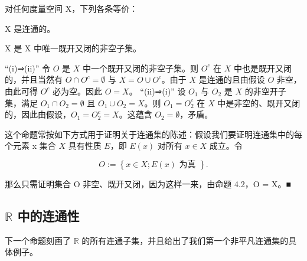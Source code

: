 \begin{proposition}

对任何度量空间 X，下列各条等价：

\begin{subitems}
\item

X 是连通的。

\item

X 是 X 中唯一既开又闭的非空子集。

\proofhead
“(i)⇒(ii)” 令 $O$ 是 $X$ 中一个既开又闭的非空子集。则 $O^{c}$ 在 $X$ 中也是既开又闭的，并且当然有 $O \cap O^{c} = \emptyset$ 与 $X = O \cup O^{c}$。由于 $X$ 是连通的且由假设 $O$ 非空，由此可得 $O^{c}$ 必为空。因此 $O = X$。
“(ii)⇒(i)” 设 $O_1$ 与 $O_2$ 是 $X$ 的非空开子集，满足 $O_1 \cap O_2 = \emptyset$ 且 $O_1 \cup O_2 = X$。则 $O_1 = O_2^c$ 在 $X$ 中是非空的、既开又闭的，因此由假设，$O_1 = O_2^c = X$。这蕴含 $O_2 = \emptyset$，矛盾。
\end{subitems}

\end{proposition}

\begin{remark}

这个命题常按如下方式用于证明关于连通集的陈述：假设我们要证明连通集中的每个元素 x 集合 $X$ 具有性质 $E$，即 $E(x)$ 对所有 $x \in X$ 成立。令

\[
O:=\left\{x\in X;E(x)\text{ 为真 }\right\}.
\]

那么只需证明集合 O 非空、既开又闭，因为这样一来，由命题 4.2，O = X。■

\end{remark}

\subsection*{$ \mathbb{R} $ 中的连通性}

下一个命题刻画了 $ \mathbb{R} $ 的所有连通子集，并且给出了我们第一个非平凡连通集的具体例子。

